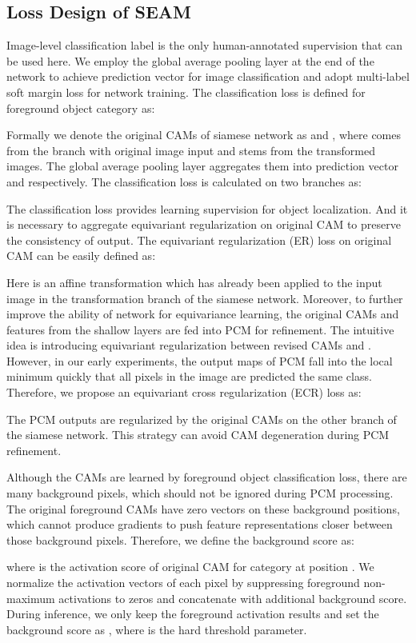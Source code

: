 \documentclass[10pt,twocolumn,letterpaper]{article}
\begin{document}
	\subsection{Loss Design of SEAM}
	\label{subsec:loss}
	Image-level classification label  is the only human-annotated supervision that can be used here. We employ the global average pooling layer at the end of the network to achieve prediction vector  for image classification and adopt multi-label soft margin loss for network training. The classification loss is defined for  foreground object category as:
	
	Formally we denote the original CAMs of siamese network as  and , where  comes from the branch with original image input and  stems from the transformed images. The global average pooling layer aggregates them into prediction vector  and  respectively. The classification loss is calculated on two branches as:
		
	The classification loss provides learning supervision for object localization. And it is necessary to aggregate equivariant regularization on original CAM to preserve the consistency of output. The equivariant regularization (ER) loss on original CAM can be easily defined as:
	
	Here  is an affine transformation which has already been applied to the input image in the transformation branch of the siamese network. Moreover, to further improve the ability of network for equivariance learning, the original CAMs and features from the shallow layers are fed into PCM for refinement. The intuitive idea is introducing equivariant regularization between revised CAMs  and . However, in our early experiments, the output maps of PCM fall into the local minimum quickly that all pixels in the image are predicted the same class. Therefore, we propose an equivariant cross regularization (ECR) loss as:
	 
	The PCM outputs are regularized by the original CAMs on the other branch of the siamese network. This strategy can avoid CAM degeneration during PCM refinement.
	
	Although the CAMs are learned by foreground object classification loss, there are many background pixels, which should not be ignored during PCM processing. The original foreground CAMs have zero vectors on these background positions, which cannot produce gradients to push feature representations closer between those background pixels. Therefore, we define the background score as:
	
	where  is the activation score of original CAM for category  at position . We normalize the activation vectors of each pixel by suppressing foreground non-maximum activations to zeros and concatenate with additional background score. During inference, we only keep the foreground activation results and set the background score as , where  is the hard threshold parameter.
	
\end{document}
